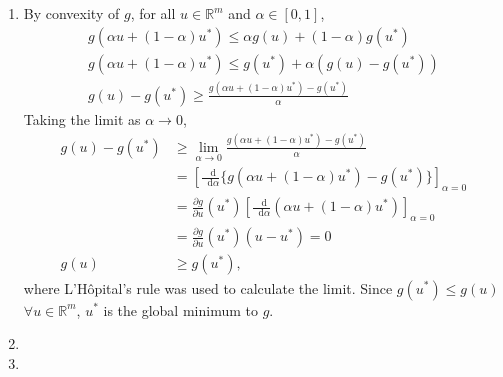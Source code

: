 \documentclass[letterpaper,12pt,titlepage]{article}
\newcommand*\dif{\mathop{}\!\mathrm{d}}
\newcommand*\pder[2]{\frac{\partial #1}{\partial #2}}
\newcommand*\R{\mathbb{R}}
\begin{document}
\begin{enumerate}[leftmargin=0pt]
\item By convexity of $g$, for all $u\in\R^m$ and $\alpha\in[0,1]$,
  \begin{gather}
    g(\alpha u + (1-\alpha)u^*) \le \alpha g(u) + (1-\alpha)g(u^*) \\
    g(\alpha u + (1-\alpha)u^*) \le g(u^*) + \alpha (g(u)-g(u^*)) \\
    g(u)-g(u^*) \ge \frac{g(\alpha u + (1-\alpha)u^*) - g(u^*)}{\alpha}
  \end{gather}
  Taking the limit as $\alpha\to0$,
  \begin{align}
    g(u)-g(u^*) &\ge \lim_{\alpha\to0} \frac{g(\alpha u + (1-\alpha)u^*) - g(u^*)}{\alpha} \\
                &= \left[ \frac{\dif}{\dif\alpha} \Big\{ g(\alpha u + (1-\alpha)u^*) - g(u^*) \Big\} \right]_{\alpha=0} \\
                &= \pder{g}{u}(u^*) \left[ \frac{\dif}{\dif\alpha} (\alpha u + (1-\alpha)u^*) \right]_{\alpha=0} \\
                &= \pder{g}{u}(u^*) (u - u^*) = 0 \\
    g(u) &\ge g(u^*),
  \end{align}
  where L'H\^opital's rule was used to calculate the limit.
  Since $g(u^*)\le g(u)$ $\forall u\in\R^m$, $u^*$ is the global minimum to $g$.


\item

\item
  
\end{enumerate}
\end{document}
